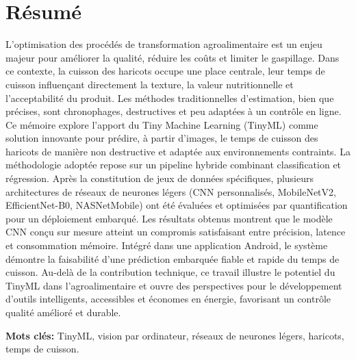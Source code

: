 \chapter*{Résumé}

L’optimisation des procédés de transformation agroalimentaire est un enjeu majeur pour améliorer la qualité, réduire les coûts et limiter le gaspillage. Dans ce contexte, la cuisson des haricots occupe une place centrale, leur temps de cuisson influençant directement la texture, la valeur nutritionnelle et l’acceptabilité du produit. Les méthodes traditionnelles d’estimation, bien que précises, sont chronophages, destructives et peu adaptées à un contrôle en ligne. Ce mémoire explore l’apport du Tiny Machine Learning (TinyML) comme solution innovante pour prédire, à partir d’images, le temps de cuisson des haricots de manière non destructive et adaptée aux environnements contraints. La méthodologie adoptée repose sur un pipeline hybride combinant classification et régression. Après la constitution de jeux de données spécifiques, plusieurs architectures de réseaux de neurones légers (CNN personnalisés, MobileNetV2, EfficientNet-B0, NASNetMobile) ont été évaluées et optimisées par quantification pour un déploiement embarqué. Les résultats obtenus montrent que le modèle CNN conçu sur mesure atteint un compromis satisfaisant entre précision, latence et consommation mémoire. Intégré dans une application Android, le système démontre la faisabilité d’une prédiction embarquée fiable et rapide du temps de cuisson. Au-delà de la contribution technique, ce travail illustre le potentiel du TinyML dans l’agroalimentaire et ouvre des perspectives pour le développement d’outils intelligents, accessibles et économes en énergie, favorisant un contrôle qualité amélioré et durable.

\vspace{0.5cm}
\noindent\textbf{Mots clés:} TinyML, vision par ordinateur, réseaux de neurones légers, haricots, temps de cuisson.